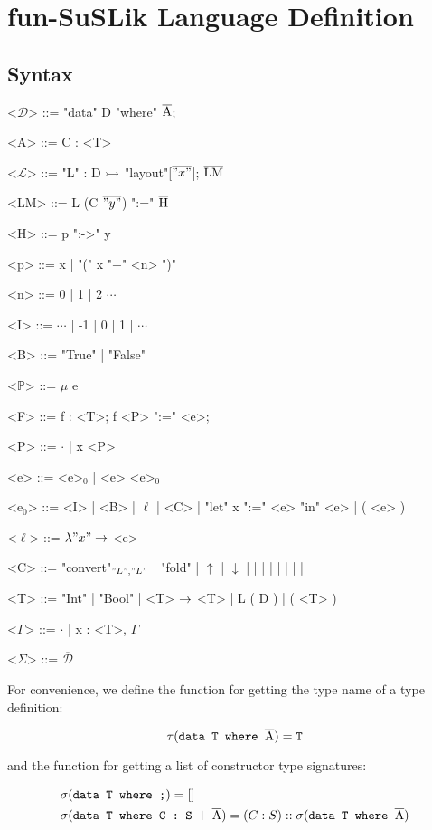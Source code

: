 \documentclass[10pt]{article}
\begin{document}
\section{fun-SuSLik Language Definition}
\label{sec:FSDef}
\subsection{Syntax}

\begin{grammar}
  <$\mathcal{D}$> ::= "data" D "where" $\overline{\textnormal{A}}$;

  <A> ::= C : <T>

  <$\mathcal{L}$> ::= "L" : D $\rightarrowtail$ "layout"[$\overline{"x"}$]; $\overline{\textnormal{LM}}$

  <LM> ::= L (C $\overline{"y"}$) ":=" $\overline{\textnormal{H}}$

  <H> ::= p ":->" y

  <p> ::= x | "(" x "+" <n> ")"

  <n> ::= 0 | 1 | 2 $\cdots$

  <I> ::= $\cdots$ | -1 | 0 | 1 | $\cdots$

  <B> ::= "True" | "False"

  <$\mathbb{P}$> ::= $\mu$ e

  <F> ::= f : <T>; f <P> ":=" <e>;

  <P> ::= $\cdot$ | x <P>

  <e> ::= <e>$_0$ | <e> <e>$_0$

  <e$_0$> ::= <I> | <B> | $\ell$ | <C> | "let" x ":=" <e> "in" <e> | ( <e> )

  <$\ell$> ::= $\lambda "x" \rightarrow$ <e>

  <C> ::= "convert"$_{"L","L"}$ | "fold" | $\uparrow$ | $\downarrow$ | \ite\; | \lesseq\; | \eq\; | \add\; | \sub\; | \; | \; | 

  <T> ::= "Int" | "Bool" | <T> $\rightarrow$ <T> | L ( D ) | ( <T> )

  <$\Gamma$> ::= $\cdot$ | x : <T>, $\Gamma$

  <$\Sigma$> ::= $\overline{\mathcal{D}}$
\end{grammar}

\noindent
For convenience, we define the function for getting the type name of a type definition:

\[
  \tau(\texttt{data T where }\overline{\textnormal{A}}) = \texttt{T}
\]

and the function for getting a list of constructor type signatures:

\begin{align*}
  &\sigma(\texttt{data T where ;}) = []
  \\
  &\sigma(\texttt{data T where C : S | }\overline{\textnormal{A}}) = (C : S) :: \sigma({\texttt{data T where }}\overline{\textnormal{A}})
\end{align*}
\end{document}
